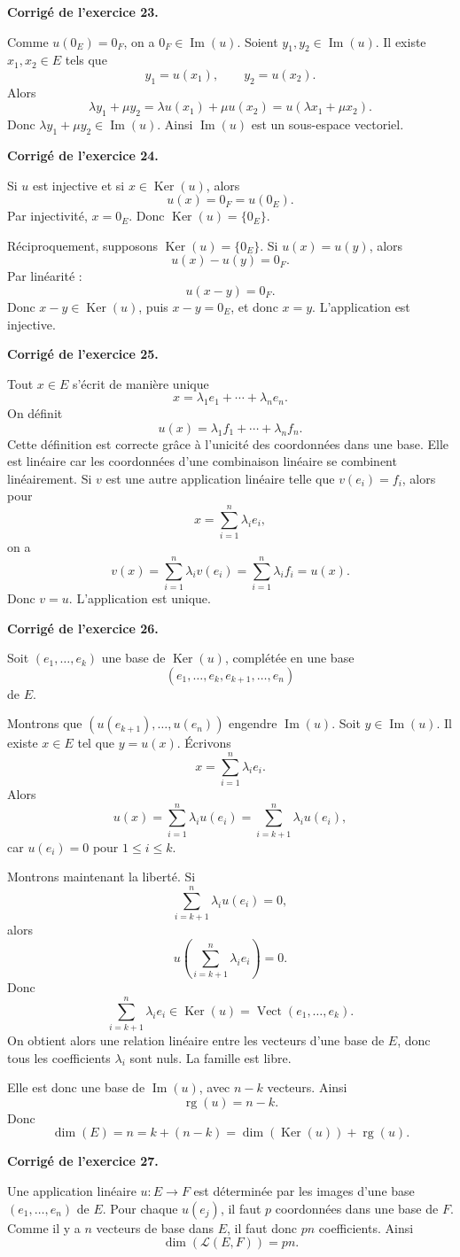 \documentclass[11pt,a4paper]{article}
\newcommand{\corr}[1]{
    \vspace{0.4cm}
    \noindent\textbf{\textcolor{blue!60!black}{Corrigé de l'exercice #1.}}
    \par\vspace{0.1cm}
}
\newcommand{\Ker}{\operatorname{Ker}}
\newcommand{\Img}{\operatorname{Im}}
\newcommand{\rg}{\operatorname{rg}}
\newcommand{\Vect}{\operatorname{Vect}}
\begin{document}
\corr{23}
Comme $u(0_E)=0_F$, on a $0_F\in\Img(u)$.
Soient $y_1,y_2\in\Img(u)$. Il existe $x_1,x_2\in E$ tels que
\[
y_1=u(x_1),\qquad y_2=u(x_2).
\]
Alors
\[
\lambda y_1+\mu y_2=\lambda u(x_1)+\mu u(x_2)=u(\lambda x_1+\mu x_2).
\]
Donc $\lambda y_1+\mu y_2\in\Img(u)$. Ainsi $\Img(u)$ est un sous-espace vectoriel.

\corr{24}
Si $u$ est injective et si $x\in\Ker(u)$, alors
\[
u(x)=0_F=u(0_E).
\]
Par injectivité, $x=0_E$. Donc $\Ker(u)=\{0_E\}$.

Réciproquement, supposons $\Ker(u)=\{0_E\}$. Si $u(x)=u(y)$, alors
\[
u(x)-u(y)=0_F.
\]
Par linéarité :
\[
u(x-y)=0_F.
\]
Donc $x-y\in\Ker(u)$, puis $x-y=0_E$, et donc $x=y$. L'application est injective.

\corr{25}
Tout $x\in E$ s'écrit de manière unique
\[
x=\lambda_1e_1+\cdots+\lambda_ne_n.
\]
On définit
\[
u(x)=\lambda_1f_1+\cdots+\lambda_nf_n.
\]
Cette définition est correcte grâce à l'unicité des coordonnées dans une base. Elle est linéaire car les coordonnées d'une combinaison linéaire se combinent linéairement.
Si $v$ est une autre application linéaire telle que $v(e_i)=f_i$, alors pour
\[
x=\sum_{i=1}^n\lambda_i e_i,
\]
on a
\[
v(x)=\sum_{i=1}^n\lambda_i v(e_i)=\sum_{i=1}^n\lambda_i f_i=u(x).
\]
Donc $v=u$. L'application est unique.

\corr{26}
Soit $(e_1,\dots,e_k)$ une base de $\Ker(u)$, complétée en une base
\[
(e_1,\dots,e_k,e_{k+1},\dots,e_n)
\]
de $E$.

Montrons que $(u(e_{k+1}),\dots,u(e_n))$ engendre $\Img(u)$. Soit $y\in\Img(u)$. Il existe $x\in E$ tel que $y=u(x)$. Écrivons
\[
x=\sum_{i=1}^n \lambda_i e_i.
\]
Alors
\[
u(x)=\sum_{i=1}^n\lambda_i u(e_i)=\sum_{i=k+1}^n\lambda_i u(e_i),
\]
car $u(e_i)=0$ pour $1\leq i\leq k$.

Montrons maintenant la liberté. Si
\[
\sum_{i=k+1}^n\lambda_i u(e_i)=0,
\]
alors
\[
u\left(\sum_{i=k+1}^n\lambda_i e_i\right)=0.
\]
Donc
\[
\sum_{i=k+1}^n\lambda_i e_i\in\Ker(u)=\Vect(e_1,\dots,e_k).
\]
On obtient alors une relation linéaire entre les vecteurs d'une base de $E$, donc tous les coefficients $\lambda_i$ sont nuls. La famille est libre.

Elle est donc une base de $\Img(u)$, avec $n-k$ vecteurs. Ainsi
\[
\rg(u)=n-k.
\]
Donc
\[
\dim(E)=n=k+(n-k)=\dim(\Ker(u))+\rg(u).
\]

\corr{27}
Une application linéaire $u:E\to F$ est déterminée par les images d'une base $(e_1,\dots,e_n)$ de $E$. Pour chaque $u(e_j)$, il faut $p$ coordonnées dans une base de $F$. Comme il y a $n$ vecteurs de base dans $E$, il faut donc $pn$ coefficients. Ainsi
\[
\dim(\mathcal{L}(E,F))=pn.
\]
\end{document}
